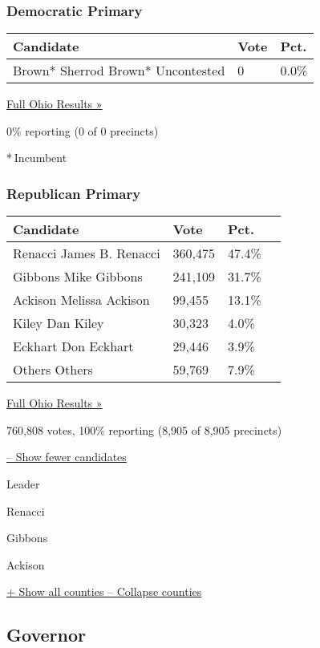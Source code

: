 \hypertarget{democratic-primary}{%
\subsubsection{Democratic Primary}\label{democratic-primary}}

\begin{longtable}[]{@{}lll@{}}
\toprule
Candidate & Vote & Pct.\tabularnewline
\midrule
\endhead
 Brown* Sherrod Brown* Uncontested & 0 & 0.0\%\tabularnewline
\bottomrule
\end{longtable}

\href{https://www.nytimes3xbfgragh.onion/elections/results/ohio}{Full
Ohio Results »}

0\% reporting (0 of 0 precincts)

* Incumbent

\hypertarget{republican-primary}{%
\subsubsection{Republican Primary}\label{republican-primary}}

\begin{longtable}[]{@{}llll@{}}
\toprule
Candidate & Vote & Pct. &\tabularnewline
\midrule
\endhead
 Renacci James B. Renacci & 360,475 & 47.4\% &\tabularnewline
 Gibbons Mike Gibbons & 241,109 & 31.7\% &\tabularnewline
 Ackison Melissa Ackison & 99,455 & 13.1\% &\tabularnewline
 Kiley Dan Kiley & 30,323 & 4.0\% &\tabularnewline
 Eckhart Don Eckhart & 29,446 & 3.9\% &\tabularnewline
 Others Others & 59,769 & 7.9\% &\tabularnewline
\bottomrule
\end{longtable}

\href{https://www.nytimes3xbfgragh.onion/elections/results/ohio}{Full
Ohio Results »}

760,808 votes, 100\% reporting (8,905 of 8,905 precincts)

\protect\hyperlink{}{-- Show fewer candidates}

Leader

 Renacci

 Gibbons

 Ackison

\protect\hyperlink{}{+ Show all counties -- Collapse counties}

\hypertarget{governor}{%
\subsection{Governor}\label{governor}}

